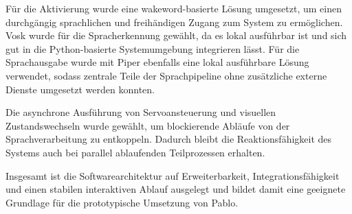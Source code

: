 Für die Aktivierung wurde eine wakeword-basierte Lösung umgesetzt, um einen durchgängig sprachlichen und freihändigen Zugang zum System zu ermöglichen. 
Vosk wurde für die Spracherkennung gewählt, da es lokal ausführbar ist und sich gut in die Python-basierte Systemumgebung integrieren lässt. 
Für die Sprachausgabe wurde mit Piper ebenfalls eine lokal ausführbare Lösung verwendet, sodass zentrale Teile der Sprachpipeline ohne zusätzliche externe Dienste umgesetzt werden konnten.

Die asynchrone Ausführung von Servoansteuerung und visuellen Zustandswechseln wurde gewählt, um blockierende Abläufe von der Sprachverarbeitung zu entkoppeln. 
Dadurch bleibt die Reaktionsfähigkeit des Systems auch bei parallel ablaufenden Teilprozessen erhalten.

Insgesamt ist die Softwarearchitektur auf Erweiterbarkeit, Integrationsfähigkeit und einen stabilen interaktiven Ablauf ausgelegt und bildet damit eine geeignete Grundlage für die prototypische Umsetzung von Pablo.